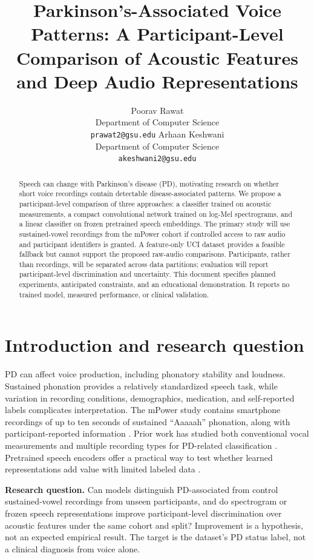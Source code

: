 \documentclass{article}
\title{Parkinson's-Associated Voice Patterns: A Participant-Level Comparison of Acoustic Features and Deep Audio Representations}
\author{
  Poorav Rawat \\
  Department of Computer Science \\
  \texttt{prawat2@gsu.edu}
  \And
  Arhaan Keshwani \\
  Department of Computer Science \\
  \texttt{akeshwani2@gsu.edu}
}
\begin{document}
\maketitle

\begin{abstract}
Speech can change with Parkinson's disease (PD), motivating research on whether short voice recordings contain detectable disease-associated patterns. We propose a participant-level comparison of three approaches: a classifier trained on acoustic measurements, a compact convolutional network trained on log-Mel spectrograms, and a linear classifier on frozen pretrained speech embeddings. The primary study will use sustained-vowel recordings from the mPower cohort if controlled access to raw audio and participant identifiers is granted. A feature-only UCI dataset provides a feasible fallback but cannot support the proposed raw-audio comparisons. Participants, rather than recordings, will be separated across data partitions; evaluation will report participant-level discrimination and uncertainty. This document specifies planned experiments, anticipated constraints, and an educational demonstration. It reports no trained model, measured performance, or clinical validation.
\end{abstract}

\section{Introduction and research question}
PD can affect voice production, including phonatory stability and loudness. Sustained phonation provides a relatively standardized speech task, while variation in recording conditions, demographics, medication, and self-reported labels complicates interpretation. The mPower study contains smartphone recordings of up to ten seconds of sustained ``Aaaaah'' phonation, along with participant-reported information \citep{bot2016}. Prior work has studied both conventional vocal measurements and multiple recording types for PD-related classification \citep{sakar2013}. Pretrained speech encoders offer a practical way to test whether learned representations add value with limited labeled data \citep{baevski2020}.

\textbf{Research question.} Can models distinguish PD-associated from control sustained-vowel recordings from unseen participants, and do spectrogram or frozen speech representations improve participant-level discrimination over acoustic features under the same cohort and split? Improvement is a hypothesis, not an expected empirical result. The target is the dataset's PD status label, not a clinical diagnosis from voice alone.
\end{document}
